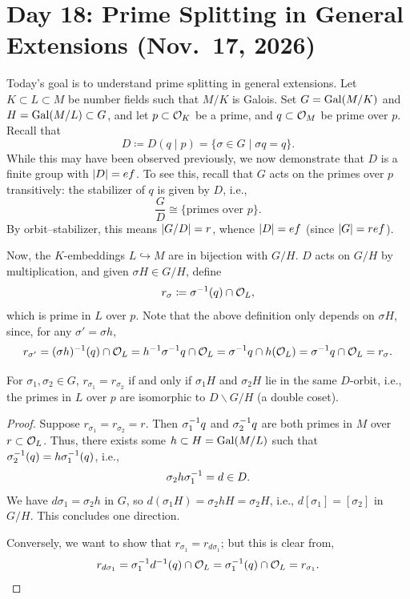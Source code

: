 \section{Day 18: Prime Splitting in General Extensions (Nov.\ 17, 2026)}
Today's goal is to understand prime splitting in general extensions. Let $K \subset L \subset M$ be number fields such that $M/K$ is Galois. Set $G = \operatorname{Gal}(M/K)$ and $H = \operatorname{Gal}(M/L) \subset G$, and let $p \subset \mathcal O_K$ be a prime, and $q \subset \mathcal O_M$ be prime over $p$. Recall that
\[ D \coloneq D(q \mid p) = \{\sigma \in G \mid \sigma q = q\}. \]
While this may have been observed previously, we now demonstrate that $D$ is a finite group with $\left\lvert D \right\rvert = ef$. To see this, recall that $G$ acts on the primes over $p$ transitively: the stabilizer of $q$ is given by $D$, i.e.,
\[ \frac{G}{D} \cong \{\text{primes over } p\}. \]
By orbit--stabilizer, this means $\left\lvert G/D \right\rvert = r$, whence $\left\lvert D \right\rvert = ef$ (since $\left\lvert G \right\rvert = ref$).

Now, the $K$-embeddings $L \hookrightarrow M$ are in bijection with $G/H$. $D$ acts on $G/H$ by multiplication, and given $\sigma H \in G/H$, define
\[ r_\sigma \coloneq \sigma^{-1}(q) \cap \mathcal O_L, \]
which is prime in $L$ over $p$. Note that the above definition only depends on $\sigma H$, since, for any $\sigma' = \sigma h$,
\[ r_{\sigma'} = (\sigma h)^{-1}(q) \cap \mathcal O_L = h^{-1} \sigma^{-1} q \cap \mathcal O_L = \sigma^{-1} q \cap h(\mathcal O_L) = \sigma^{-1} q \cap \mathcal O_L = r_\sigma. \] \vspace{-20pt}
\begin{proposition} \label{prop:equal_D_orbits}
    For $\sigma_1, \sigma_2 \in G$, $r_{\sigma_1} = r_{\sigma_2}$ if and only if $\sigma_1 H$ and $\sigma_2 H$ lie in the same $D$-orbit, i.e., the primes in $L$ over $p$ are isomorphic to $D \backslash G / H$ (a double coset).
\end{proposition}
\begin{proof}
    Suppose $r_{\sigma_1} = r_{\sigma_2} = r$. Then $\sigma_1^{-1} q$ and $\sigma_2^{-1} q$ are both primes in $M$ over $r \subset \mathcal O_L$. Thus, there exists some $h \subset H = \operatorname{Gal}(M/L)$ such that $\sigma_2^{-1}(q) = h \sigma_1^{-1}(q)$, i.e.,
    \[ \sigma_2 h \sigma_1^{-1} = d \in D. \]
    We have $d \sigma_1 = \sigma_2 h$ in $G$, so $d(\sigma_1 H) = \sigma_2 h H = \sigma_2 H$, i.e., $d [\sigma_1] = [\sigma_2]$ in $G/H$. This concludes one direction.

    Conversely, we want to show that $r_{\sigma_1} = r_{d \sigma_1}$; but this is clear from,
    \[ r_{d \sigma_1} = \sigma_1^{-1} d^{-1} (q) \cap \mathcal O_L = \sigma_1^{-1}(q) \cap \mathcal O_L = r_{\sigma_1}. \qedhere \]
\end{proof}

